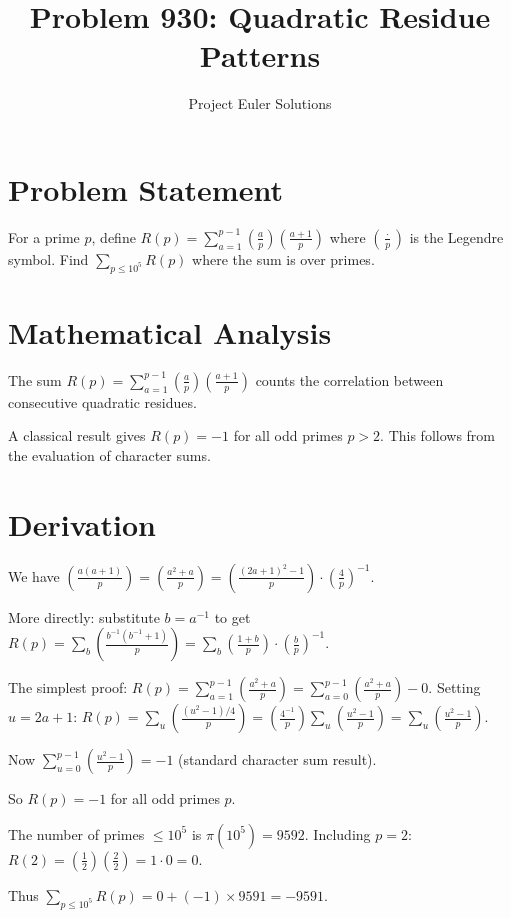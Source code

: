 \documentclass[11pt]{article}
\title{Problem 930: Quadratic Residue Patterns}
\author{Project Euler Solutions}
\date{}
\begin{document}
\maketitle

\section{Problem Statement}
For a prime $p$, define $R(p) = \sum_{a=1}^{p-1} \left(\frac{a}{p}\right)\left(\frac{a+1}{p}\right)$ where $\left(\frac{\cdot}{p}\right)$ is the Legendre symbol. Find $\sum_{p \leq 10^5} R(p)$ where the sum is over primes.

\section{Mathematical Analysis}
The sum $R(p) = \sum_{a=1}^{p-1} \left(\frac{a}{p}\right)\left(\frac{a+1}{p}\right)$ counts the correlation between consecutive quadratic residues.

A classical result gives $R(p) = -1$ for all odd primes $p > 2$. This follows from the evaluation of character sums.

\section{Derivation}
We have $\left(\frac{a(a+1)}{p}\right) = \left(\frac{a^2+a}{p}\right) = \left(\frac{(2a+1)^2 - 1}{p}\right) \cdot \left(\frac{4}{p}\right)^{-1}$.

More directly: substitute $b = a^{-1}$ to get $R(p) = \sum_{b} \left(\frac{b^{-1}(b^{-1}+1)}{p}\right) = \sum_b \left(\frac{1+b}{p}\right) \cdot \left(\frac{b}{p}\right)^{-1}$.

The simplest proof: $R(p) = \sum_{a=1}^{p-1}\left(\frac{a^2+a}{p}\right) = \sum_{a=0}^{p-1}\left(\frac{a^2+a}{p}\right) - 0$. Setting $u = 2a+1$: $R(p) = \sum_{u}\left(\frac{(u^2-1)/4}{p}\right) = \left(\frac{4^{-1}}{p}\right)\sum_u\left(\frac{u^2-1}{p}\right) = \sum_u\left(\frac{u^2-1}{p}\right)$.

Now $\sum_{u=0}^{p-1}\left(\frac{u^2-1}{p}\right) = -1$ (standard character sum result).

So $R(p) = -1$ for all odd primes $p$.

The number of primes $\leq 10^5$ is $\pi(10^5) = 9592$. Including $p=2$: $R(2) = \left(\frac{1}{2}\right)\left(\frac{2}{2}\right) = 1 \cdot 0 = 0$.

Thus $\sum_{p \leq 10^5} R(p) = 0 + (-1) \times 9591 = -9591$.
\end{document}
